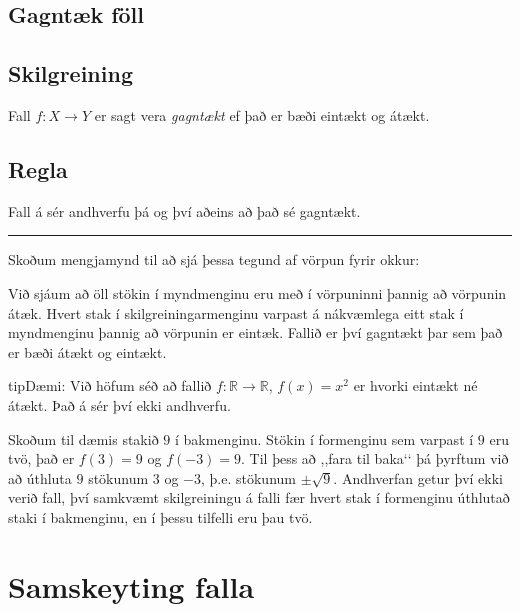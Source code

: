 \documentclass[a4paper,10pt,icelandic]{sphinxmanual}
\begin{document}
\subsection{Gagntæk föll}
\label{\detokenize{Kafli09:gagntaek-foll}}

\subsection{Skilgreining}
\label{\detokenize{Kafli09:id2}}
Fall \(f: X \to Y\) er sagt vera \textit{gagntækt} ef það er bæði eintækt og átækt.


\subsection{Regla}
\label{\detokenize{Kafli09:regla}}
Fall á sér andhverfu þá og því aðeins að það sé gagntækt.


\bigskip\hrule\bigskip


Skoðum mengjamynd til að sjá þessa tegund af vörpun fyrir okkur:


Við sjáum að öll stökin í myndmenginu eru með í vörpuninni þannig að vörpunin átæk.
Hvert stak í skilgreiningarmenginu varpast á nákvæmlega eitt stak í myndmenginu þannig að vörpunin er eintæk.
Fallið er því gagntækt þar sem það er bæði átækt og eintækt.

\begin{sphinxadmonition}{tip}{Dæmi:}
Við höfum séð að fallið \(f: \mathbb{R} \to \mathbb{R}\), \(f(x)=x^2\) er hvorki eintækt né átækt.
Það á sér því ekki andhverfu.

Skoðum til dæmis stakið \(9\) í bakmenginu.
Stökin í formenginu sem varpast í \(9\) eru tvö, það er \(f(3)=9\) og \(f(-3)=9\).
Til þess að ,,fara til baka‘‘ þá þyrftum við að úthluta \(9\) stökunum \(3\) og \(-3\), þ.e. stökunum \(\pm \sqrt{9}\).
Andhverfan getur því ekki verið fall, því samkvæmt skilgreiningu á falli fær hvert stak í formenginu úthlutað  staki í bakmenginu, en í þessu tilfelli eru þau tvö.
\end{sphinxadmonition}


\section{Samskeyting falla}
\label{\detokenize{Kafli09:samskeyting-falla}}
\end{document}
